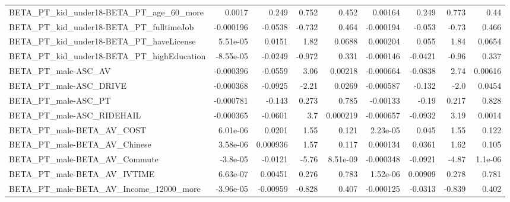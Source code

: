 \begin{tabular}{lrrrrrrrr}
BETA\_PT\_kid\_under18-BETA\_PT\_age\_60\_more            &      0.0017 &        0.249 &     0.752 &    0.452 &    0.00164 &       0.249 &        0.773 &          0.44 \\
BETA\_PT\_kid\_under18-BETA\_PT\_fulltimeJob            &   -0.000196 &      -0.0538 &    -0.732 &    0.464 &  -0.000194 &      -0.053 &        -0.73 &         0.466 \\
BETA\_PT\_kid\_under18-BETA\_PT\_haveLicense            &    5.51e-05 &       0.0151 &      1.82 &   0.0688 &   0.000204 &       0.055 &         1.84 &        0.0654 \\
BETA\_PT\_kid\_under18-BETA\_PT\_highEducation          &   -8.55e-05 &      -0.0249 &    -0.972 &    0.331 &  -0.000146 &     -0.0421 &        -0.96 &         0.337 \\
BETA\_PT\_male-ASC\_AV                                &   -0.000396 &      -0.0559 &      3.06 &  0.00218 &  -0.000664 &     -0.0838 &         2.74 &       0.00616 \\
BETA\_PT\_male-ASC\_DRIVE                             &   -0.000368 &      -0.0925 &     -2.21 &   0.0269 &  -0.000587 &      -0.132 &         -2.0 &        0.0454 \\
BETA\_PT\_male-ASC\_PT                                &   -0.000781 &       -0.143 &     0.273 &    0.785 &   -0.00133 &       -0.19 &        0.217 &         0.828 \\
BETA\_PT\_male-ASC\_RIDEHAIL                          &   -0.000365 &      -0.0601 &       3.7 & 0.000219 &  -0.000657 &     -0.0932 &         3.19 &        0.0014 \\
BETA\_PT\_male-BETA\_AV\_COST                          &    6.01e-06 &       0.0201 &      1.55 &    0.121 &   2.23e-05 &       0.045 &         1.55 &         0.122 \\
BETA\_PT\_male-BETA\_AV\_Chinese                       &    3.58e-06 &     0.000936 &      1.57 &    0.117 &   0.000134 &      0.0361 &         1.62 &         0.105 \\
BETA\_PT\_male-BETA\_AV\_Commute                       &    -3.8e-05 &      -0.0121 &     -5.76 & 8.51e-09 &  -0.000348 &     -0.0921 &        -4.87 &       1.1e-06 \\
BETA\_PT\_male-BETA\_AV\_IVTIME                        &    6.63e-07 &      0.00451 &     0.276 &    0.783 &   1.52e-06 &     0.00909 &        0.278 &         0.781 \\
BETA\_PT\_male-BETA\_AV\_Income\_12000\_more             &   -3.96e-05 &     -0.00959 &    -0.828 &    0.407 &  -0.000125 &     -0.0313 &       -0.839 &         0.402 \\

\end{tabular}
